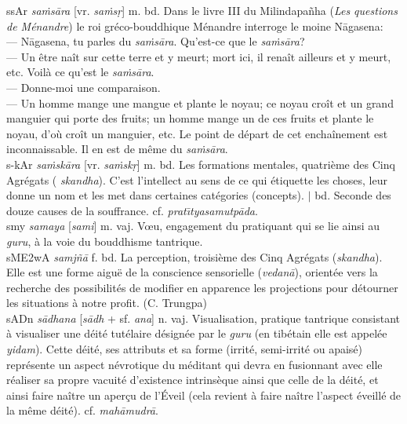 \documentclass[a4paper,11pt,twocolumn]{article}
\begin{document}
{\dn s\2sAr} {\em sa\.{m}s\={a}ra} [vr. {\em sa\.{m}s\d{r}}]
m. bd. Dans le livre III du Milindapa\~{n}ha ({\em Les questions de
Ménandre}) le roi gréco-bouddhique Ménandre interroge le moine
N\={a}gasena: \\
\og --- N\={a}gasena, tu parles du {\em sa\.{m}s\={a}ra}. Qu'est-ce que le
{\em sa\.{m}s\={a}ra}? \\
--- Un être naît sur cette terre et y meurt; mort ici, il renaît
ailleurs et y meurt, etc. Voilà ce qu'est le {\em sa\.{m}s\={a}ra}. \\
--- Donne-moi une comparaison. \\
--- Un homme mange une mangue et plante le noyau; ce noyau croît et un
grand manguier qui porte des fruits; un homme mange un de ces fruits
et plante le noyau, d'où croît un manguier, etc. Le point de départ de
cet enchaînement est inconnaissable. Il en est de même du
{\em sa\.{m}s\={a}ra}.\fg \\

{\dn s\2-kAr} {\em sa\.{m}sk\={a}ra} [vr. {\em sa\.{m}sk\d{r}}]
m. bd. \og Les formations mentales\fg, quatrième des Cinq Agrégats ({\em
skandha}). C'est l'intellect au sens de ce qui étiquette les choses,
leur donne un nom et les met dans certaines catégories
(concepts). $\mid$ bd. Seconde des douze causes de la
souffrance. cf. {\em prat\={\i}tyasamutp\={a}da}. \\

{\dn smy} {\em samaya} [{\em sami}] m. vaj. \og V{\oe}u\fg, engagement
du pratiquant qui se lie ainsi au {\em guru}, à la voie du bouddhisme
tantrique. \\


{\dn sM\3E2wA} {\em samj\~{n}\={a}} f. bd. \og La perception\fg, troisième
des Cinq Agrégats ({\em skandha}). Elle est une forme aigu\"{e} de la
conscience sensorielle ({\em vedan\={a}}), orientée vers la
recherche des possibilités de modifier en apparence les projections
pour détourner les situations à notre profit. (C. Trungpa) \\

{\dn sADn} {\em s\={a}dhana} [{\em s\={a}dh} + sf. {\em ana}]
n. vaj. \og Visualisation\fg, pratique tantrique consistant à visualiser
une déité tutélaire désignée par le {\em guru} (en tibétain elle est
appelée {\em yidam}). Cette déité, ses attributs et sa forme
(irrité, semi-irrité ou apaisé) représente un aspect névrotique du
méditant qui devra en fusionnant avec elle réaliser sa propre vacuité
d'existence intrinsèque ainsi que celle de la déité, et ainsi faire
naître un aper\c{c}u de l'Éveil (cela revient à faire naître l'aspect
éveillé de la même déité). cf. {\em mah\={a}mudr\={a}}. \\
\end{document}
